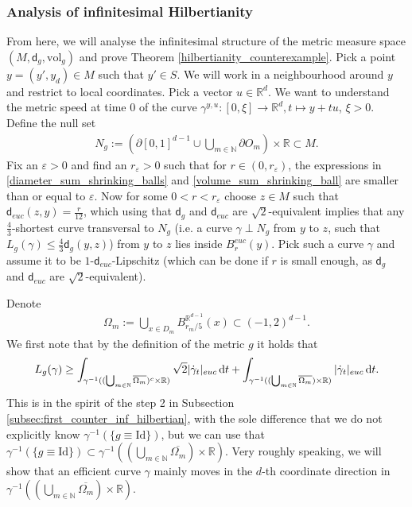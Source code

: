 \documentclass[a4paper,10pt]{article}
\numberwithin{equation}{section}
\newcommand{\R}{\mathbb{R}}
\newcommand{\N}{\mathbb{N}}
\newcommand{\e}{\varepsilon}
\newcommand{\vol}{\mathrm{vol}}
\newcommand{\sfd}{\mathsf d}
\newcommand{\di}{{\rm d}}
\begin{document}
\subsubsection{Analysis of infinitesimal Hilbertianity}\label{subsub:hilbertian}
From here, we will analyse the infinitesimal structure of the metric measure space $(M, \sfd_g, \vol_g)$ and prove Theorem \ref{hilbertianity_counterexample}.
Pick a point $y=(y', y_d) \in M$ such that $y' \in S$. We will work in a neighbourhood around $y$ and restrict to local coordinates. Pick a vector $u \in \R^d$. 
We want to understand the metric speed at time $0$ of the curve $\gamma^{y, u}: [0, \xi] \to \R^d, t \mapsto y+tu$, $\xi >0$. 
Define the null set 
\begin{align}
    N_g:= (\partial [0,1]^{d-1} \cup \bigcup_{m \in \N} \partial O_m) \times \R \subset M. 
\end{align}
Fix an $\e>0$ and find an $r_\e>0$ such that for $r \in (0,r_\e)$, the expressions in \eqref{diameter_sum_shrinking_balls} and \eqref{volume_sum_shrinking_ball} are smaller than or equal to $\e$. 
Now for some $0 <r < r_\e$ choose $z \in M$ such that $\sfd_{euc}(z,y) = \frac{r}{12}$, which using that $\sfd_g$ and $\sfd_{euc}$ are $\sqrt{2}$-equivalent implies that any $\frac{4}{3}$-shortest curve transversal to $N_g$ (i.e. a curve $\gamma \perp N_g$ from $y$ to $z$, such that $L_g(\gamma) \leq \frac{4}{3}\sfd_g(y,z)$) from $y$ to $z$ lies inside $B_r^{euc}(y)$. Pick such a curve $\gamma$ and assume it to be $1$-$\sfd_{euc}$-Lipschitz (which can be done if $r$ is small enough, as $\sfd_g$ and $\sfd_{euc}$ are $\sqrt{2}$-equivalent). 

Denote 
\begin{align}
    \Omega_m := \bigcup_{x \in D_m} B^{\R^{d-1}}_{r_m/5}(x) \subset (-1, 2)^{d-1}.
\end{align}
%
We first note that by the definition of the metric $g$ it holds that 
\begin{align}\label{length_of_curve_splitted_in_sets}
    L_g(\gamma) \geq  \int_{\gamma^{-1}((\bigcup_{m\in \N}\overline{\Omega_m})^c\times \R)} \sqrt{2}|\dot{\gamma}_t|_{euc} \, \di t + \int_{\gamma^{-1}((\bigcup_{m\in \N}\overline{\Omega_m})\times \R)} |\dot{\gamma}_t|_{euc} \, \di t.
\end{align}
This is in the spirit of the step 2 in Subsection \ref{subsec:first_counter_inf_hilbertian}, with the sole difference that we do not explicitly know $\gamma^{-1}(\{g \equiv \mathrm{Id}\})$, but we can use that $\gamma^{-1}(\{g \equiv \mathrm{Id}\}) \subset \gamma^{-1}((\bigcup_{m\in \N}\overline{\Omega_m})\times \R)$. Very roughly speaking, we will show that an efficient curve $\gamma$ mainly moves in the $d$-th coordinate direction in $\gamma^{-1}((\bigcup_{m\in \N}\overline{\Omega_m})\times \R)$. 
\end{document}
